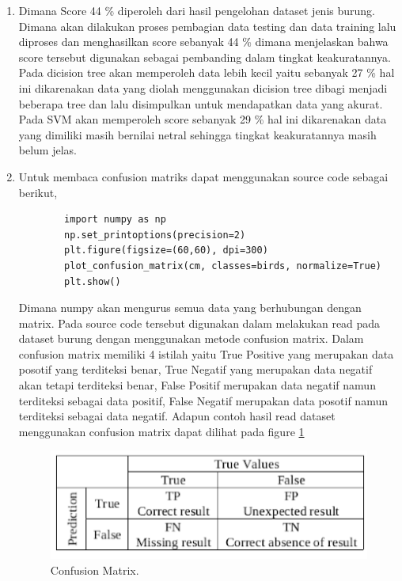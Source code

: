 \begin{enumerate}
\item Dimana Score 44 \% diperoleh dari hasil pengelohan dataset jenis burung. Dimana akan dilakukan proses pembagian data testing dan data training lalu diproses dan menghasilkan score sebanyak 44 \% dimana menjelaskan bahwa score tersebut digunakan sebagai pembanding dalam tingkat keakuratannya. Pada dicision tree akan memperoleh data lebih kecil yaitu sebanyak 27 \% hal ini dikarenakan data yang diolah menggunakan dicision tree dibagi menjadi beberapa tree dan lalu disimpulkan untuk mendapatkan data yang akurat. Pada SVM akan memperoleh score sebanyak 29 \% hal ini dikarenakan data yang dimiliki masih bernilai netral sehingga tingkat keakuratannya masih belum jelas.

\item Untuk membaca confusion matriks dapat menggunakan source code sebagai berikut,
	\begin{verbatim}
		import numpy as np
		np.set_printoptions(precision=2)
		plt.figure(figsize=(60,60), dpi=300)
		plot_confusion_matrix(cm, classes=birds, normalize=True)
		plt.show()
	\end{verbatim}

Dimana numpy akan mengurus semua data yang berhubungan dengan matrix. Pada source code tersebut digunakan dalam melakukan read pada dataset burung dengan menggunakan metode confusion matrix. Dalam confusion matrix memiliki 4 istilah yaitu True Positive yang merupakan data posotif yang terditeksi benar, True Negatif yang merupakan data negatif akan tetapi terditeksi benar, False Positif merupakan data negatif namun terditeksi sebagai data positif, False Negatif merupakan data posotif namun terditeksi sebagai data negatif. Adapun contoh hasil read dataset menggunakan confusion matrix dapat dilihat pada figure \ref{YNCM}
	
	\begin{figure}[ht]
	\centerline{\includegraphics[width=1\textwidth]{figures/YN/YNCM.PNG}}
	\caption{Confusion Matrix.}
	\label{YNCM}
	\end{figure}


\end{enumerate}
